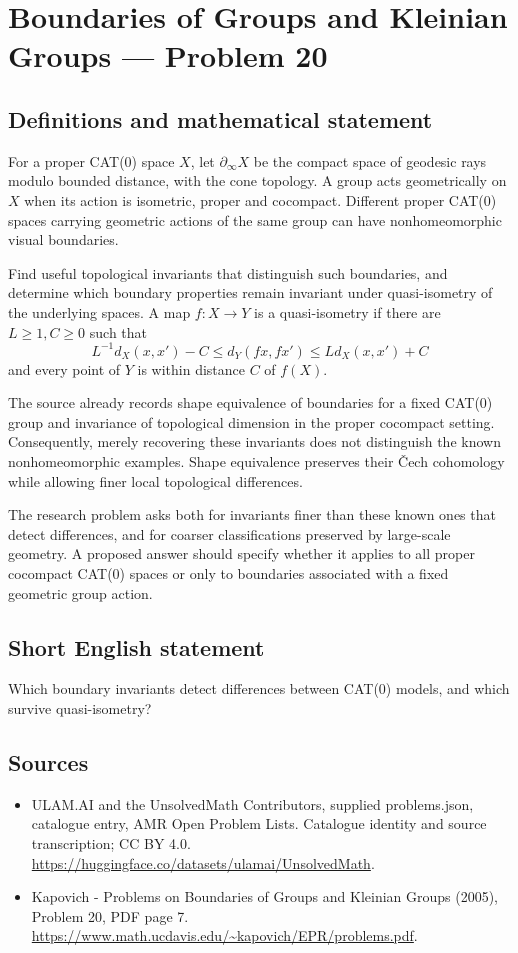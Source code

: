 \documentclass[11pt,a4paper]{article}
\begin{document}
\section*{Boundaries of Groups and Kleinian Groups — Problem 20}\label{statement}

\subsection{Definitions and mathematical statement}
For a proper CAT(0) space $X$, let $\partial_\infty X$ be the compact space of geodesic rays modulo bounded distance, with the cone topology. A group acts geometrically on $X$ when its action is isometric, proper and cocompact. Different proper CAT(0) spaces carrying geometric actions of the same group can have nonhomeomorphic visual boundaries.

Find useful topological invariants that distinguish such boundaries, and determine which boundary properties remain invariant under quasi-isometry of the underlying spaces. A map $f:X\to Y$ is a quasi-isometry if there are $L\geq1,C\geq0$ such that
\[
 L^{-1}d_X(x,x')-C\leq d_Y(fx,fx')\leq Ld_X(x,x')+C
\]
and every point of $Y$ is within distance $C$ of $f(X)$.

The source already records shape equivalence of boundaries for a fixed CAT(0) group and invariance of topological dimension in the proper cocompact setting. Consequently, merely recovering these invariants does not distinguish the known nonhomeomorphic examples. Shape equivalence preserves their \v{C}ech cohomology while allowing finer local topological differences.

The research problem asks both for invariants finer than these known ones that detect differences, and for coarser classifications preserved by large-scale geometry. A proposed answer should specify whether it applies to all proper cocompact CAT(0) spaces or only to boundaries associated with a fixed geometric group action.
\subsection{Short English statement}
Which boundary invariants detect differences between CAT(0) models, and which survive quasi-isometry?
\subsection{Sources}
\begin{itemize}
\item[S1] ULAM.AI and the UnsolvedMath Contributors, supplied problems.json, catalogue entry, AMR Open Problem Lists. Catalogue identity and source transcription; CC BY 4.0.
\url{https://huggingface.co/datasets/ulamai/UnsolvedMath}.
\item[S2] Kapovich - Problems on Boundaries of Groups and Kleinian Groups (2005), Problem 20, PDF page 7. 
\url{https://www.math.ucdavis.edu/~kapovich/EPR/problems.pdf}.
\end{itemize}
\end{document}
